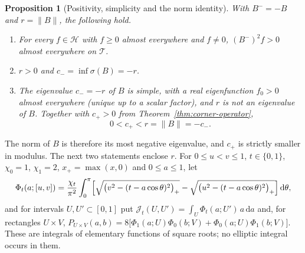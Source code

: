 \documentclass[preprint,12pt,a4paper]{elsarticle}
\newtheorem{proposition}[theorem]{Proposition}
\theoremstyle{remark}
\newcommand{\dd}{\,\mathrm d}
\begin{document}
\begin{proposition}[Positivity, simplicity and the norm identity]\label{prop:positivity}
With $B^-=-B$ and $r=\|B\|$, the following hold.
\begin{enumerate}
\item[(i)] For every $f\in\mathcal H$ with $f\ge0$ almost everywhere and
 $f\ne0$, $(B^-)^2f>0$ almost everywhere on $\mathcal T$.
\item[(ii)] $r>0$ and $c_-=\inf\sigma(B)=-r$.
\item[(iii)] The eigenvalue $c_-=-r$ of $B$ is simple, with a real
 eigenfunction $f_0>0$ almost everywhere (unique up to a scalar factor), and
 $r$ is not an eigenvalue of $B$. Together with $c_+>0$ from
 Theorem~\ref{thm:corner-operator},
 \[
  0<c_+<r=\|B\|=-c_- .
 \]
\end{enumerate}
\end{proposition}

The norm of $B$ is therefore its most negative eigenvalue, and
$c_+$ is strictly smaller in modulus. The next two statements enclose $r$.
For $0\le u<v\le1$, $t\in\{0,1\}$, $\chi_0=1$, $\chi_1=2$, $x_+=\max(x,0)$ and
$0\le a\le1$, let
\begin{equation}\label{eq:I-t}
 \Phi_t(a;[u,v])=\frac{\chi_t}{\pi^2}\int_0^\pi
 \Bigl[\sqrt{\bigl(v^2-(t-a\cos\theta)^2\bigr)_+}
      -\sqrt{\bigl(u^2-(t-a\cos\theta)^2\bigr)_+}\Bigr]\dd\theta ,
\end{equation}
and for intervals $U,U'\subset[0,1]$ put $\mathcal J_t(U,U')=\int_U\Phi_t(a;U')\,a\dd a$ and,
for rectangles $U\times V$,
$P_{U\times V}(a,b)=8\bigl[\Phi_1(a;U)\Phi_0(b;V)+\Phi_0(a;U)\Phi_1(b;V)\bigr]$.
These are integrals of elementary functions of square roots; no elliptic
integral occurs in them.
\end{document}
